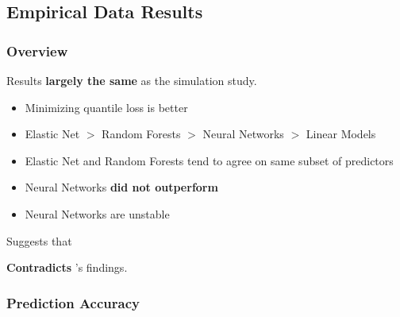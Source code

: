 \documentclass[aspectratio=169]{beamer}
\begin{document}
\subsection{Empirical Data Results}

\begin{frame}
\frametitle{Overview}

Results \textbf{largely the same} as the simulation study.

\begin{itemize}
	\item Minimizing quantile loss is better
	\item Elastic Net $>$ Random Forests $>$ Neural Networks $>$ Linear Models
	\item Elastic Net and Random Forests tend to agree on same subset of predictors
	\item Neural Networks \textbf{did not outperform}
	\item Neural Networks are unstable
\end{itemize}

Suggests that 

\textbf{Contradicts} \cite{gu_empirical_2018}'s findings.

\end{frame}


\subsubsection{Prediction Accuracy}



\end{document}
